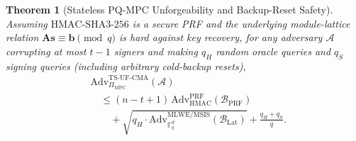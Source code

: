 \documentclass[conference,compsoc]{IEEEtran}
\newtheorem{theorem}{Theorem}
\begin{document}
\begin{theorem}[Stateless PQ-MPC Unforgeability and Backup-Reset Safety]
\label{thm:mpc}
Assuming $\mathrm{HMAC\text{-}SHA3\text{-}256}$ is a secure PRF and the underlying module-lattice relation $\mathbf{A}\mathbf{s} \equiv \mathbf{b} \pmod q$ is hard against key recovery, for any adversary $\mathcal{A}$ corrupting at most $t - 1$ signers and making $q_H$ random oracle queries and $q_S$ signing queries (including arbitrary cold-backup resets),
\begin{equation}
\begin{aligned}
&\mathrm{Adv}^{\mathrm{TS\text{-}UF\text{-}CMA}}_{\Pi_{\mathrm{MPC}}}(\mathcal{A}) \\
  &\quad \le (n - t + 1)\,\mathrm{Adv}^{\mathrm{PRF}}_{\mathrm{HMAC}}(\mathcal{B}_{\mathrm{PRF}}) \\
  &\qquad + \sqrt{q_H \cdot \mathrm{Adv}^{\mathrm{MLWE/MSIS}}_{\mathbb{F}_q^d}(\mathcal{B}_{\mathrm{Lat}})} + \frac{q_H + q_S}{q}.
\end{aligned}
\end{equation}
\end{theorem}
\end{document}
